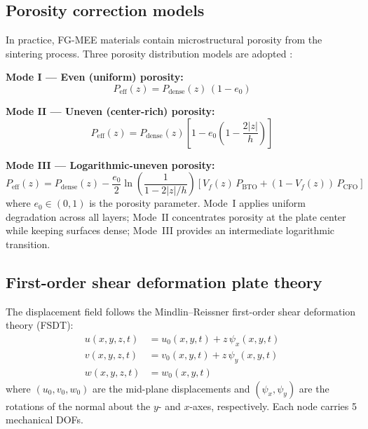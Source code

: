 \documentclass[11pt,a4paper]{article}
\begin{document}
\subsection{Porosity correction models}

In practice, FG-MEE materials contain microstructural porosity from the sintering process. Three porosity distribution models are adopted \citep{wattanasakulpong2014}:

\textbf{Mode I --- Even (uniform) porosity:}
\begin{equation}
P_{\text{eff}}(z) = P_{\text{dense}}(z)\,(1 - e_0)
\label{eq:poro-even}
\end{equation}

\textbf{Mode II --- Uneven (center-rich) porosity:}
\begin{equation}
P_{\text{eff}}(z) = P_{\text{dense}}(z)\left[1 - e_0\left(1 - \frac{2|z|}{h}\right)\right]
\label{eq:poro-uneven}
\end{equation}

\textbf{Mode III --- Logarithmic-uneven porosity:}
\begin{equation}
P_{\text{eff}}(z) = P_{\text{dense}}(z) - \frac{e_0}{2}\ln\!\left(\frac{1}{1 - 2|z|/h}\right)\left[V_f(z)\,P_{\text{BTO}} + (1-V_f(z))\,P_{\text{CFO}}\right]
\label{eq:poro-log}
\end{equation}
where $e_0 \in (0, 1)$ is the porosity parameter. Mode~I applies uniform degradation across all layers; Mode~II concentrates porosity at the plate center while keeping surfaces dense; Mode~III provides an intermediate logarithmic transition.

\subsection{First-order shear deformation plate theory}

The displacement field follows the Mindlin--Reissner first-order shear deformation theory (FSDT):
\begin{equation}
\begin{aligned}
u(x,y,z,t) &= u_0(x,y,t) + z\,\psi_x(x,y,t) \\
v(x,y,z,t) &= v_0(x,y,t) + z\,\psi_y(x,y,t) \\
w(x,y,z,t) &= w_0(x,y,t)
\end{aligned}
\label{eq:fsdt}
\end{equation}
where $(u_0, v_0, w_0)$ are the mid-plane displacements and $(\psi_x, \psi_y)$ are the rotations of the normal about the $y$- and $x$-axes, respectively. Each node carries 5 mechanical DOFs.
\end{document}
